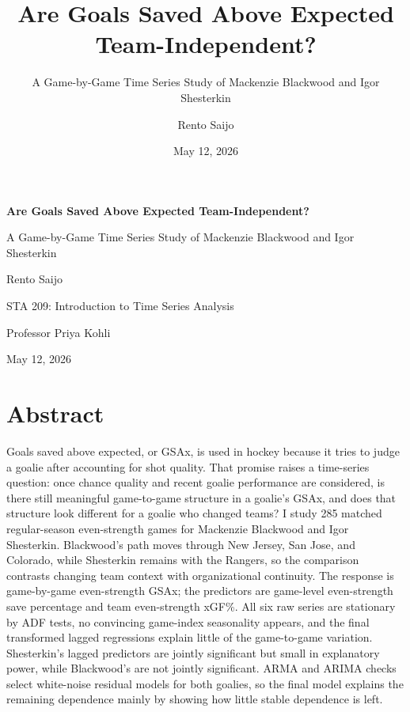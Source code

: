 \documentclass[
  10pt,
]{article}
\title{Are Goals Saved Above Expected Team-Independent?}
\subtitle{A Game-by-Game Time Series Study of Mackenzie Blackwood and Igor Shesterkin}
\author{Rento Saijo}
\date{May 12, 2026}
\renewcommand{\maketitle}{}
\begin{document}
\maketitle

\begin{titlepage}
\thispagestyle{empty}
\begin{center}
\vspace*{\fill}
{\LARGE\bfseries Are Goals Saved Above Expected Team-Independent?\par}
\vspace{0.22in}
{\large A Game-by-Game Time Series Study of Mackenzie Blackwood and Igor Shesterkin\par}
\vspace{0.35in}
{\normalsize Rento Saijo\par}
\vspace{0.14in}
{\normalsize STA 209: Introduction to Time Series Analysis\par}
{\normalsize Professor Priya Kohli\par}
\vspace{0.14in}
{\normalsize May 12, 2026\par}
\vspace*{\fill}
\end{center}
\end{titlepage}
\setcounter{page}{1}
\doublespacing

\section{Abstract}\label{abstract}

Goals saved above expected, or GSAx, is used in hockey because it tries to judge a goalie after accounting for shot quality. That promise raises a time-series question: once chance quality and recent goalie performance are considered, is there still meaningful game-to-game structure in a goalie's GSAx, and does that structure look different for a goalie who changed teams? I study 285 matched regular-season even-strength games for Mackenzie Blackwood and Igor Shesterkin. Blackwood's path moves through New Jersey, San Jose, and Colorado, while Shesterkin remains with the Rangers, so the comparison contrasts changing team context with organizational continuity. The response is game-by-game even-strength GSAx; the predictors are game-level even-strength save percentage and team even-strength xGF\%. All six raw series are stationary by ADF tests, no convincing game-index seasonality appears, and the final transformed lagged regressions explain little of the game-to-game variation. Shesterkin's lagged predictors are jointly significant but small in explanatory power, while Blackwood's are not jointly significant. ARMA and ARIMA checks select white-noise residual models for both goalies, so the final model explains the remaining dependence mainly by showing how little stable dependence is left.
\end{document}

